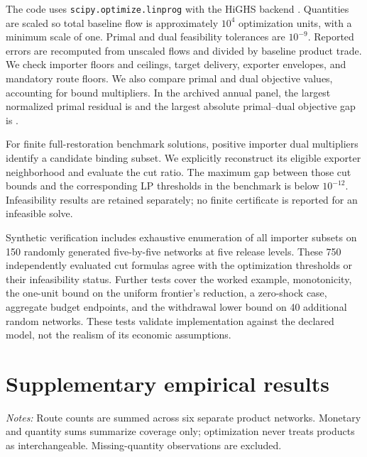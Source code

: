 \documentclass[11pt,a4paper]{article}
\begin{document}
The code uses \texttt{scipy.optimize.linprog} with the HiGHS backend \citep{scipy}. Quantities are scaled so total baseline flow is approximately $10^4$ optimization units, with a minimum scale of one. Primal and dual feasibility tolerances are $10^{-9}$. Reported errors are recomputed from unscaled flows and divided by baseline product trade. We check importer floors and ceilings, target delivery, exporter envelopes, and mandatory route floors. We also compare primal and dual objective values, accounting for bound multipliers. In the archived annual panel, the largest normalized primal residual is \MaxResidual{} and the largest absolute primal--dual objective gap is \MaxGap{}.

For finite full-restoration benchmark solutions, positive importer dual multipliers identify a candidate binding subset. We explicitly reconstruct its eligible exporter neighborhood and evaluate the cut ratio. The maximum gap between those cut bounds and the corresponding LP thresholds in the benchmark is below $10^{-12}$. Infeasibility results are retained separately; no finite certificate is reported for an infeasible solve.

Synthetic verification includes exhaustive enumeration of all importer subsets on 150 randomly generated five-by-five networks at five release levels. These 750 independently evaluated cut formulas agree with the optimization thresholds or their infeasibility status. Further tests cover the worked example, monotonicity, the one-unit bound on the uniform frontier's reduction, a zero-shock case, aggregate budget endpoints, and the withdrawal lower bound on 40 additional random networks. These tests validate implementation against the declared model, not the realism of its economic assumptions.

\section{Supplementary empirical results}
\begin{table}[htbp]\centering\small
\caption{Annual coverage of the selected products}\label{tab:annual}

\begin{minipage}{\textwidth}\footnotesize\textit{Notes:} Route counts are summed across six separate product networks. Monetary and quantity sums summarize coverage only; optimization never treats products as interchangeable. Missing-quantity observations are excluded.\end{minipage}
\end{table}
\end{document}
